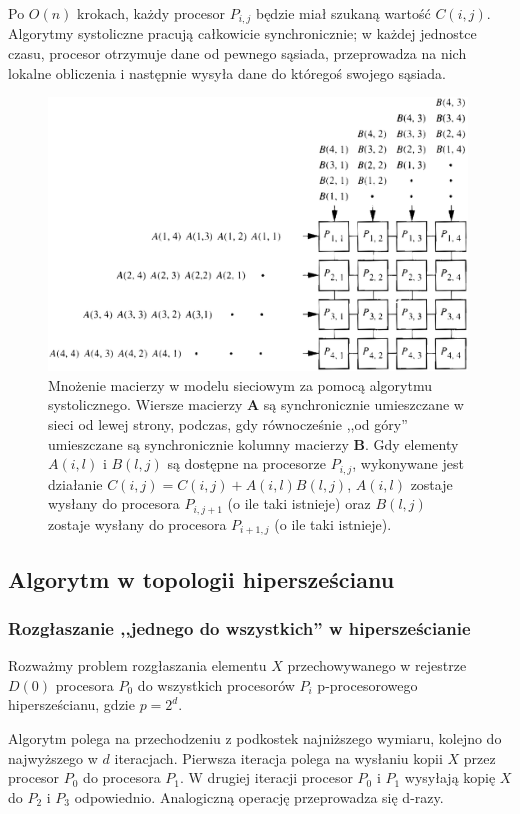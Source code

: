 \documentclass[a4paper,oneside,leqno,12pt]{book}
\theoremstyle{definition}
\theoremstyle{plain}
\theoremstyle{remark}
\begin{document}
Po \(O(n)\) krokach, każdy procesor \(P_{i,j}\) będzie miał szukaną wartość \(C(i,j)\).\\

Algorytmy systoliczne pracują całkowicie synchronicznie; w każdej jednostce czasu, procesor otrzymuje dane od pewnego sąsiada, przeprowadza na nich lokalne obliczenia i następnie wysyła dane do któregoś swojego sąsiada.

\begin{figure}[h]
\centering
\includegraphics[width=30em]{./images/systolic2.eps}
\caption{Mnożenie macierzy w modelu sieciowym za pomocą algorytmu systolicznego. Wiersze macierzy \(\mathbf{A}\) są synchronicznie umieszczane w sieci od lewej strony, podczas, gdy równocześnie ,,od góry'' umieszczane są synchronicznie kolumny macierzy \(\mathbf{B}\). Gdy elementy \(A(i,l)\) i \(B(l,j)\) są dostępne na procesorze \(P_{i,j}\), wykonywane jest działanie \(C(i,j)=C(i,j)+A(i,l)B(l,j)\), \(A(i,l)\) zostaje wysłany do procesora \(P_{i,j+1}\) (o ile taki istnieje) oraz \(B(l,j)\) zostaje wysłany do procesora \(P_{i+1,j}\) (o ile taki istnieje).}
\label{fig:systolic_mesh}
\end{figure}

\subsection{Algorytm w topologii hipersześcianu}
\subsubsection{Rozgłaszanie ,,jednego do wszystkich'' w hipersześcianie}
Rozważmy problem rozgłaszania elementu \(X\) przechowywanego w rejestrze \(D(0)\) procesora \(P_0\) do wszystkich procesorów \(P_i\) p-procesorowego hipersześcianu, gdzie \(p=2^d\).

Algorytm polega na przechodzeniu z podkostek najniższego wymiaru, kolejno do najwyższego w \(d\) iteracjach. Pierwsza iteracja polega na wysłaniu kopii \(X\) przez procesor \(P_0\) do procesora \(P_1\). W drugiej iteracji procesor \(P_0\) i \(P_1\) wysyłają kopię \(X\) do \(P_2\) i \(P_3\) odpowiednio. Analogiczną operację przeprowadza się d-razy.
\end{document}

